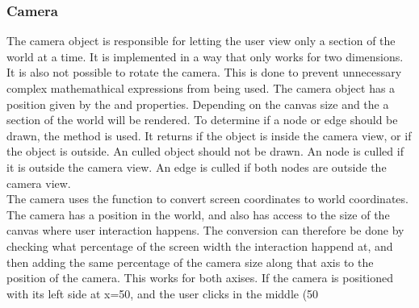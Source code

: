 \subsubsection{Camera}
The camera object is responsible for letting the user view only a section of the world at a time. It is implemented in a way that only works for two dimensions. It is also not possible to rotate the camera. This is done to prevent unnecessary complex mathemathical expressions from being used. The camera object has a position given by the  and  properties. Depending on the canvas size and the  a section of the world will be rendered. To determine if a node or edge should be drawn, the  method is used. It returns  if the object is inside the camera view, or  if the object is outside. An culled object should not be drawn. An node is culled if it is outside the camera view. An edge is culled if both nodes are outside the camera view.
\\[11pt]
The camera uses the  function to convert screen coordinates to world coordinates. The camera has a position in the world, and also has access to the size of the canvas where user interaction happens. The conversion can therefore be done by checking what percentage of the screen width the interaction happend at, and then adding the same percentage of the camera size along that axis to the position of the camera. This works for both axises. If the camera is positioned with its left side at x=50, and the user clicks in the middle (50%
